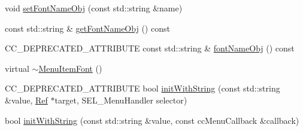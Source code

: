 \begin{DoxyCompactItemize}
\item 
void \hyperlink{classMenuItemFont_adc4776710917649f4dcb527d61ac49d7}{set\+Font\+Name\+Obj} (const std\+::string \&name)
\item 
const std\+::string \& \hyperlink{classMenuItemFont_aa871b31127d3c1a44e0795a1f12c4dfe}{get\+Font\+Name\+Obj} () const
\item 
C\+C\+\_\+\+D\+E\+P\+R\+E\+C\+A\+T\+E\+D\+\_\+\+A\+T\+T\+R\+I\+B\+U\+TE const std\+::string \& \hyperlink{classMenuItemFont_a839ea5b34276117ca79a1f920ceb4c81}{font\+Name\+Obj} () const
\item 
virtual \hyperlink{classMenuItemFont_a39897c55a5ff14b10656b7609e942f2f}{$\sim$\+Menu\+Item\+Font} ()
\item 
C\+C\+\_\+\+D\+E\+P\+R\+E\+C\+A\+T\+E\+D\+\_\+\+A\+T\+T\+R\+I\+B\+U\+TE bool \hyperlink{classMenuItemFont_abeedcee69a16a6256ac410fcd3c80028}{init\+With\+String} (const std\+::string \&value, \hyperlink{classRef}{Ref} $\ast$target, S\+E\+L\+\_\+\+Menu\+Handler selector)
\item 
bool \hyperlink{classMenuItemFont_adcc053518d3c01691ed13798055188e8}{init\+With\+String} (const std\+::string \&value, const cc\+Menu\+Callback \&callback)
\end{DoxyCompactItemize}
